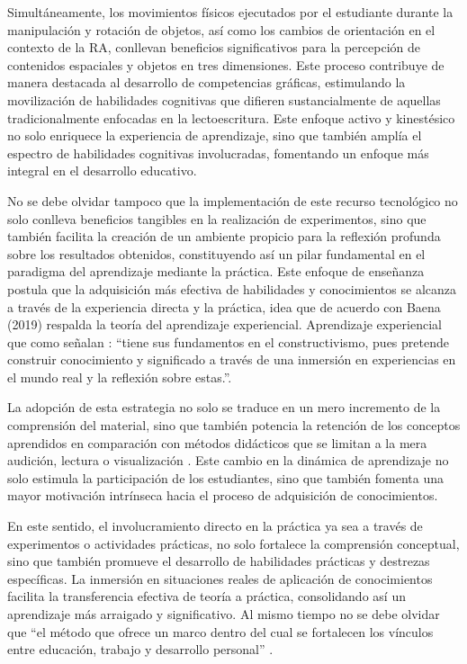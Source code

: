 \documentclass[spanish]{textolivre}
\begin{document}
Simultáneamente, los movimientos físicos ejecutados por el estudiante durante la manipulación y rotación de objetos, así como los cambios de orientación en el contexto de la RA, conllevan beneficios significativos para la percepción de contenidos espaciales y objetos en tres dimensiones. Este proceso contribuye de manera destacada al desarrollo de competencias gráficas, estimulando la movilización de habilidades cognitivas que difieren sustancialmente de aquellas tradicionalmente enfocadas en la lectoescritura. Este enfoque activo y kinestésico no solo enriquece la experiencia de aprendizaje, sino que también amplía el espectro de habilidades cognitivas involucradas, fomentando un enfoque más integral en el desarrollo educativo.

No se debe olvidar tampoco que la implementación de este recurso tecnológico no solo conlleva beneficios tangibles en la realización de experimentos, sino que también facilita la creación de un ambiente propicio para la reflexión profunda sobre los resultados obtenidos, constituyendo así un pilar fundamental en el paradigma del aprendizaje mediante la práctica. Este enfoque de enseñanza postula que la adquisición más efectiva de habilidades y conocimientos se alcanza a través de la experiencia directa y la práctica, idea que de acuerdo con Baena (2019) respalda la teoría del aprendizaje experiencial. Aprendizaje experiencial que como señalan \textcite[p.~4]{gleason2020implementacion}: “tiene sus fundamentos en el constructivismo, pues pretende construir conocimiento y significado a través de una inmersión en experiencias en el mundo real y la reflexión sobre estas.”.

La adopción de esta estrategia no solo se traduce en un mero incremento de la comprensión del material, sino que también potencia la retención de los conceptos aprendidos en comparación con métodos didácticos que se limitan a la mera audición, lectura o visualización \cite{luque2022aprendizaje,espinar2023aprendizaje}. Este cambio en la dinámica de aprendizaje no solo estimula la participación de los estudiantes, sino que también fomenta una mayor motivación intrínseca hacia el proceso de adquisición de conocimientos.

En este sentido, el involucramiento directo en la práctica ya sea a través de experimentos o actividades prácticas, no solo fortalece la comprensión conceptual, sino que también promueve el desarrollo de habilidades prácticas y destrezas específicas. La inmersión en situaciones reales de aplicación de conocimientos facilita la transferencia efectiva de teoría a práctica, consolidando así un aprendizaje más arraigado y significativo. Al mismo tiempo no se debe olvidar que “el método que ofrece un marco dentro del cual se fortalecen los vínculos entre educación, trabajo y desarrollo personal” \cite[p.~6]{gleason2020implementacion}.
\end{document}
